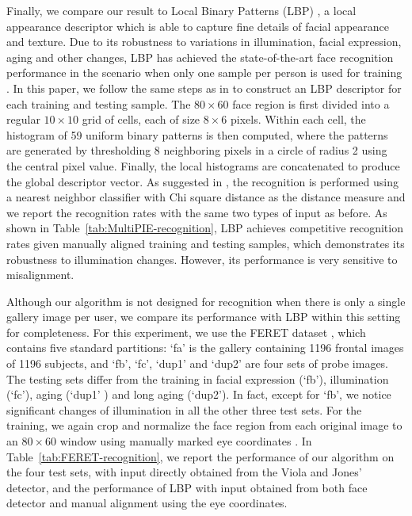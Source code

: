 \documentclass[12pt,journal,draftcls,letterpaper,onecolumn]{IEEEtran}
\begin{document}
Finally, we compare our result to Local Binary Patterns (LBP)
\cite{Ahonen2006-PAMI}, a local appearance descriptor which is
able to capture fine details of facial appearance and texture.
Due to its robustness to variations in illumination, facial
expression, aging and other changes, LBP has achieved the
state-of-the-art face recognition performance in the scenario
when only one sample per person is used for training
\cite{Tan06facerecognition}. In this paper, we follow the same
steps as in \cite{Ahonen2006-PAMI} to construct an LBP
descriptor for each training and testing sample. The $80\times
60$ face region is first divided into a regular $10\times 10$
grid of cells, each of size $8\times 6$ pixels. Within each
cell, the histogram of 59 uniform binary patterns is then
computed, where the patterns are generated by thresholding 8
neighboring pixels in a circle of radius 2 using the central
pixel value. Finally, the local histograms are concatenated to
produce the global descriptor vector. As suggested in
\cite{Ahonen2006-PAMI}, the recognition is performed using a
nearest neighbor classifier with Chi square distance as the
distance measure and we report the recognition rates with the
same two types of input as before. As shown in
Table~\ref{tab:MultiPIE-recognition}, LBP achieves competitive
recognition rates given manually aligned training and testing
samples, which demonstrates its robustness to illumination
changes. However, its performance is very sensitive to
misalignment. 

Although our algorithm is not designed for
recognition when there is only a single gallery image per user,
we compare its
performance with LBP within this setting for completeness.
For this experiment, we use the FERET dataset
\cite{phillips1998feret}, which contains five standard
partitions: `fa' is the gallery containing 1196 frontal images
of 1196 subjects, and `fb', `fc', `dup1' and `dup2' are four
sets of probe images. The testing sets differ from the training
in facial expression (`fb'), illumination (`fc'), aging (`dup1'
) and long aging (`dup2'). In fact, except for `fb', we notice
significant changes of illumination in all the other three test
sets. For the training, we again crop and normalize the face
region from each original image to an $80\times 60$ window
using manually marked eye coordinates \cite{Deng2010-PR}. In
Table~\ref{tab:FERET-recognition}, we report the performance of
our algorithm on the four test sets, with input directly
obtained from the Viola and Jones' detector, and the
performance of LBP with input obtained from both face detector
and manual alignment using the eye coordinates.
\end{document}
